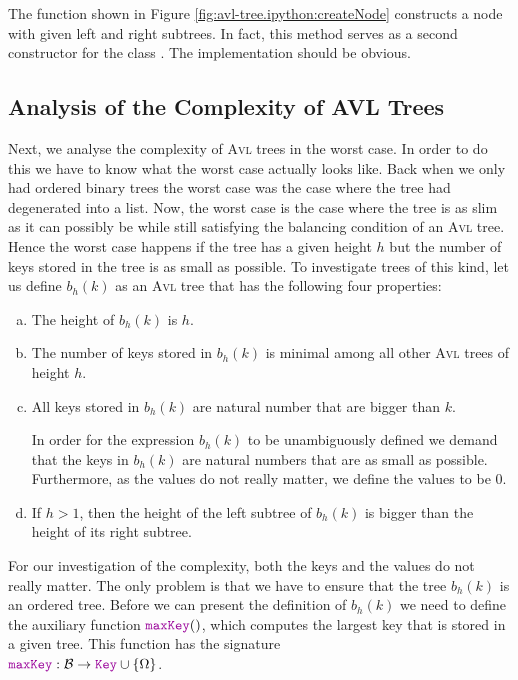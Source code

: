 The function  shown in Figure \ref{fig:avl-tree.ipython:createNode}
constructs a node with given left and right subtrees.  In fact, this method serves as a second
constructor for the class .  The implementation should be obvious.


\subsection{Analysis of the Complexity of AVL Trees}
Next, we analyse the complexity of \textsc{Avl} trees in the worst case.  In order to do this we have to know
what the worst case actually looks like.  Back when we only had ordered binary trees the worst case was the case where
the tree had degenerated into a list.  Now, the worst case is the case where the tree is as slim as
it can possibly be while still satisfying the balancing condition of an \textsc{Avl} tree.  Hence the worst case
happens if the tree has a given height $h$ but the number of keys stored in the tree is as small as
possible.  To investigate trees of this kind, let us define  $b_h(k)$ as an \textsc{Avl} tree that has the following four
properties:
\begin{enumerate}[(a)]
\item The height of $b_h(k)$ is $h$.
\item The number of keys stored in $b_h(k)$ is minimal among all other \textsc{Avl} trees of height $h$.  
\item All keys stored in  $b_h(k)$ are natural number that are bigger than  $k$.

      In order for the expression $b_h(k)$ to be unambiguously defined we demand that the keys
      in $b_h(k)$ are natural numbers that are as small as possible.  Furthermore, as the values do
      not really matter, we define the values to be $0$.
\item If $h > 1$, then the height of the left subtree of $b_h(k)$ is bigger than the height of its right subtree.
\end{enumerate}
For our investigation of the complexity, both the keys and the values do not really matter.  The only problem
is that we have to ensure that the tree $b_h(k)$ is an ordered tree.
Before we can present the definition of $b_h(k)$ we need to define the auxiliary function
$\mytt{maxKey}()$, which computes the largest key that is stored in a given tree.  This function has the
 signature  
\\[0.2cm]
\hspace*{1.3cm}
$\mytt{maxKey}:\mathcal{B} \rightarrow \mytt{Key} \cup \{ \Omega \}$.
